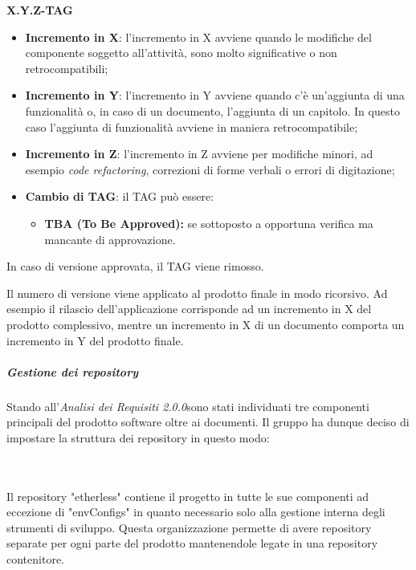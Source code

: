 \centerline{\textbf{X.Y.Z-TAG}}


\begin{itemize}
  \item \textbf{Incremento in X}: l'incremento in X avviene quando le modifiche del componente soggetto all'attività, sono molto significative o non retrocompatibili;
  \item \textbf{Incremento in Y}: l'incremento in Y avviene quando c'è un'aggiunta
  di una funzionalità o, in caso di un documento, l'aggiunta di un capitolo. In questo caso l'aggiunta di funzionalità avviene in maniera retrocompatibile;
  \item \textbf{Incremento in Z}: l'incremento in Z avviene per modifiche minori,
  ad esempio \textit{code refactoring\glos}, correzioni di forme verbali o errori di digitazione;
  \item \textbf{Cambio di TAG}: il TAG può essere:
  \begin{itemize}
  	\item \textbf{TBA (To Be Approved):} se sottoposto a opportuna verifica ma mancante di approvazione.
  \end{itemize}

\end{itemize}
  In caso di versione approvata, il TAG viene rimosso.
  
 \noindent Il numero di versione viene applicato al prodotto finale in modo ricorsivo. Ad esempio il rilascio dell'applicazione corrisponde ad un incremento in X del prodotto complessivo, mentre un incremento in X di un documento comporta un incremento in Y del prodotto finale.
 



\subparagraph*{Gestione dei repository}
Stando all'\textit{Analisi dei Requisiti 2.0.0}\doc sono stati individuati
tre componenti principali del prodotto software oltre ai documenti.
Il gruppo ha dunque deciso di impostare la struttura dei repository in questo modo:\\\\

\vspace{1cm}

\noindent \\Il repository "etherless" contiene il progetto in tutte le sue componenti
ad eccezione di "envConfigs" in quanto necessario solo alla gestione interna
degli strumenti di sviluppo. Questa organizzazione permette di avere repository separate per ogni parte
del prodotto mantenendole legate in una repository contenitore.

